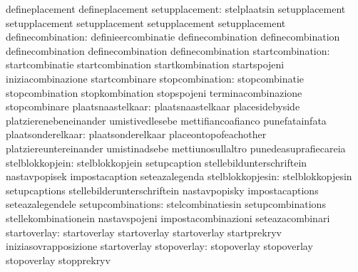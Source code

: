                  defineplacement                  defineplacement
 setupplacement: stelplaatsin                     setupplacement
                 setupplacement                   setupplacement
                 setupplacement                   setupplacement
               definecombination: definieercombinatie              definecombination
                                  definecombination                definecombination
                                  definecombination                definecombination
                startcombination: startcombinatie                  startcombination
                                  startkombination                 startspojeni
                                  iniziacombinazione               startcombinare
                 stopcombination: stopcombinatie                   stopcombination
                                  stopkombination                  stopspojeni
                                  terminacombinazione              stopcombinare
               plaatsnaastelkaar: plaatsnaastelkaar                placesidebyside
                                  platzierenebeneinander           umistivedlesebe
                                  mettifiancoafianco               punefatainfata
               plaatsonderelkaar: plaatsonderelkaar                placeontopofeachother
                                  platziereuntereinander           umistinadsebe
                                  mettiunosullaltro                punedeasuprafiecareia
                 stelblokkopjein: stelblokkopjein                  setupcaption
                                  stellebildunterschriftein        nastavpopisek
                                  impostacaption                   seteazalegenda %
                stelblokkopjesin: stelblokkopjesin                 setupcaptions
                                  stellebilderunterschriftein      nastavpopisky
                                  impostacaptions                  seteazalegendele %
               setupcombinations: stelcombinatiesin                setupcombinations
                                  stellekombinationein             nastavspojeni
                                  impostacombinazioni              seteazacombinari
                    startoverlay: startoverlay                     startoverlay
                                  startoverlay                     startprekryv
                                  iniziasovrapposizione            startoverlay
                     stopoverlay: stopoverlay                      stopoverlay
                                  stopoverlay                      stopprekryv
